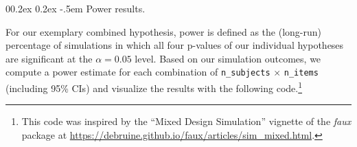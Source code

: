 \documentclass[
  man,
  floatsintext,
  longtable,
  a4paper,
  nolmodern,
  notxfonts,
  notimes,
  colorlinks=true,linkcolor=blue,citecolor=blue,urlcolor=blue]{apa7}
\makeatletter
\renewcommand{\paragraph}{\@startsection{paragraph}{4}{\parindent}%
	{0\baselineskip \@plus 0.2ex \@minus 0.2ex}%
	{-.5em}%
	{\normalfont\normalsize\bfseries\typesectitle}}
\makeatother
\begin{document}
\paragraph{Power results.}\label{power-results}

For our exemplary combined hypothesis, power is defined as the
(long-run) percentage of simulations in which all four p-values of our
individual hypotheses are significant at the \(\alpha = 0.05\) level.
Based on our simulation outcomes, we compute a power estimate for each
combination of \texttt{n\_subjects} \(\times\) \texttt{n\_items}
(including 95\% CIs) and visualize the results with the following
code.\footnote{This code was inspired by the ``Mixed Design Simulation''
  vignette of the \emph{faux} package at
  \url{https://debruine.github.io/faux/articles/sim_mixed.html}.}
\end{document}
